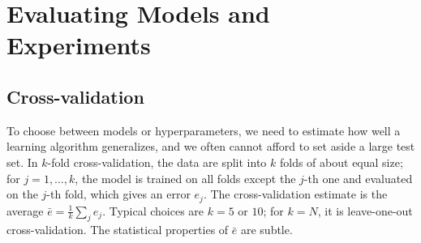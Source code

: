 \documentclass[11pt]{article}
\theoremstyle{definition}
\theoremstyle{plain}
\theoremstyle{remark}
\begin{document}
\section{Evaluating Models and Experiments}\label{sec:evaluation}

\subsection{Cross-validation}

To choose between models or hyperparameters, we need to estimate how well a learning algorithm generalizes, and we often cannot afford to set aside a large test set. In $k$-fold cross-validation, the data are split into $k$ folds of about equal size; for $j = 1, \ldots, k$, the model is trained on all folds except the $j$-th one and evaluated on the $j$-th fold, which gives an error $e_j$. The cross-validation estimate is the average $\bar e = \frac{1}{k}\sum_j e_j$. Typical choices are $k = 5$ or $10$; for $k = N$, it is leave-one-out cross-validation. The statistical properties of $\bar e$ are subtle.
\end{document}
